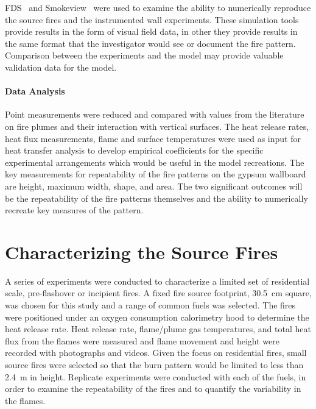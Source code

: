 \documentclass[twoside]{uocthesis}
\begin{document}
{FDS~\cite{McGrattan:2014} and Smokeview~\cite{Forney:2014} were used to examine the ability to numerically reproduce the source fires and the instrumented wall experiments. These simulation tools provide results in the form of visual field data, in other they provide results in the same format that the investigator would see or document the fire pattern.  Comparison between the experiments and the model may provide valuable validation data for the model.

\subsubsection{Data Analysis}

Point measurements were reduced and compared with values from the literature on fire plumes and their interaction with vertical surfaces.  The heat release rates, heat flux measurements, flame and surface temperatures were used as input for heat transfer analysis to develop empirical coefficients for the specific experimental arrangements which would be useful in the model recreations.
The key measurements for repeatability of the fire patterns on the gypsum wallboard are height, maximum width, shape, and area.  The two significant outcomes will be the repeatability of the fire patterns themselves and the ability to numerically recreate key measures of the pattern.


\chapter{Characterizing the Source Fires}
\label{chapter:Characterizing the Source Fires}

A series of experiments were conducted to characterize a limited set of  residential scale, pre-flashover or incipient fires.  A fixed fire source footprint, 30.5~cm square, was chosen for this study and a range of common fuels was selected.  The fires were positioned under an oxygen consumption calorimetry hood to determine the heat release rate.  Heat release rate, flame/plume gas temperatures, and total heat flux from the flames were measured and flame movement and height were recorded with photographs and videos.  Given the focus on residential fires, small source fires were selected so that the burn pattern would be limited to less than 2.4~m in height.  Replicate experiments were conducted with each of the fuels, in order to examine the repeatability of the fires and to quantify the variability in the flames.

}
\end{document}
